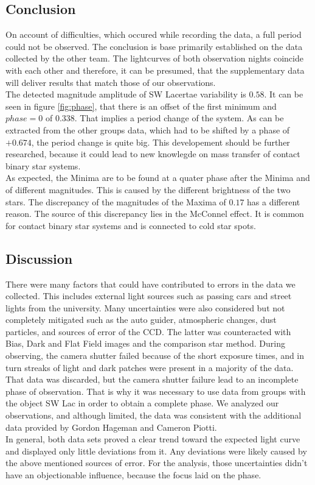 \subsection{Conclusion}
  \label{sec:fuckoff}
  On account of difficulties, which occured while recording the data, a full period could not
  be observed. The conclusion is base primarily established on the data collected by the other team.
  The lightcurves of both observation nights coincide with each other and therefore, 
  it can be presumed, that the supplementary data will deliver results that match those of our 
  observations.\\
  \noindent The detected magnitude amplitude of SW Lacertae variability is $0.58$. 
  It can be seen in figure \ref{fig:phase}, that there is an offset of the first minimum 
  and $phase = 0$ of $ 0.338$. That implies a period change of the system. As can be extracted from
  the other groups data, which had to be shifted by a phase of 
  $+0.674$, the period change is quite big. This developement should be 
  further researched, because it could lead to new knowlegde on mass transfer of contact binary
  star systems.\\
  \noindent As expected, the Minima are to be found at a quater phase after the Minima and
  of different magnitudes. This is caused by the different brightness
  of the two stars. The discrepancy of the magnitudes of the Maxima of $0.17$ has a different reason. The source 
  of this discrepancy lies in the McConnel effect. It is common for contact binary star systems 
  and is connected to cold star spots.

\subsection{Discussion}
  \label{sec:orange}
  \noindent There were many factors that could have contributed to errors in the data we collected. 
  This includes external light sources such as
  passing cars and street lights from the university. Many uncertainties were also considered but not 
  completely mitigated such as the auto guider, atmospheric changes, dust particles, and sources of error of the CCD.
  The latter was counteracted with Bias, Dark and Flat Field images and the comparison star method.
  During observing, the camera shutter failed 
  because of the short exposure times, 
  and in turn streaks of light and dark patches were present in a majority of the data. That data
  was discarded, but the camera shutter failure lead to an incomplete phase of observation.
  That is why it was necessary to use data from groups with the object SW Lac
  in order to obtain a complete phase. We analyzed our observations, and although limited, 
  the data was consistent with the additional 
  data provided by Gordon Hageman and Cameron Piotti. \\
  In general, both data sets proved a clear trend toward the expected light curve and displayed only little
  deviations from it. Any deviations were likely caused by the above mentioned sources of error. For the analysis, those 
  uncertainties didn't have an objectionable influence, because the focus laid on the phase.
  

